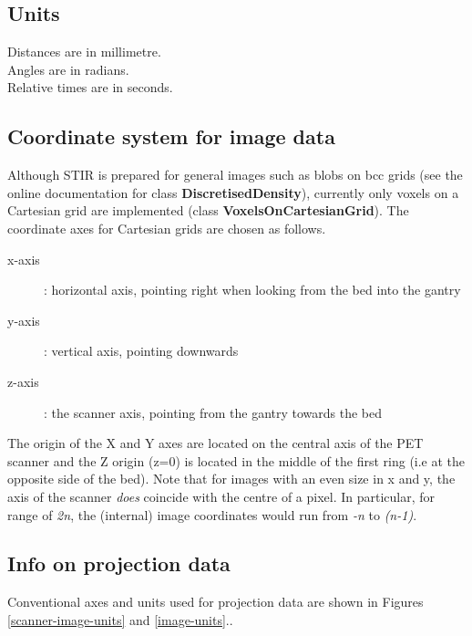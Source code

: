\documentclass{article}
\begin{document}
\subsection{
Units }

Distances are in millimetre.\\
Angles are in radians.\\
Relative times are in seconds.

\subsection{
Coordinate system for image data }

Although STIR is prepared for general images such as blobs on 
bcc grids (see the online documentation for class \textbf{DiscretisedDensity}), 
currently only voxels on a Cartesian grid are implemented (class \textbf{VoxelsOnCartesianGrid}). 
The coordinate axes for Cartesian grids are chosen as follows.
\begin{description}
\item[x-axis] : horizontal axis, pointing right when looking from 
the bed into the gantry
\item[y-axis] : vertical axis, pointing downwards
\item[z-axis] : the scanner axis, pointing from the gantry towards 
the bed
\end{description}
The origin of the X and Y axes are located on the central axis 
of the PET scanner and the Z origin (z=0) is located in the middle 
of the first ring (i.e at the opposite side of the bed). Note 
that for images with an even size in x and y, the axis of the 
scanner \textit{does} coincide with the centre of a pixel. In particular, 
for range of \textit{2n}, the (internal) image coordinates would run 
from \textit{-n} to \textit{(n-1)}.



\subsection{
Info on projection data}

Conventional axes and units used for projection data are shown 
in Figures \ref{scanner-image-units} and \ref{image-units}..
\end{document}
